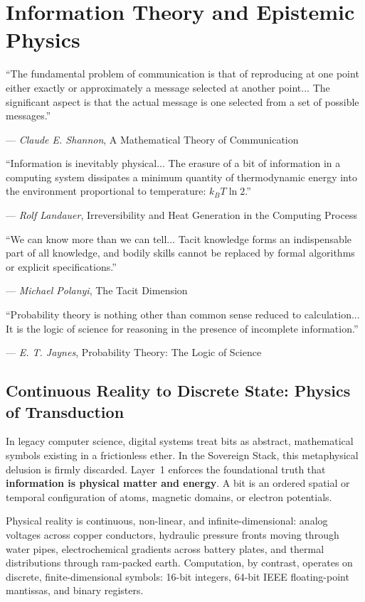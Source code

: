 \chapter{Information Theory and Epistemic Physics}
\label{chap:information_epistemology}

\epigraph{
    ``The fundamental problem of communication is that of reproducing at one point either exactly or approximately a message selected at another point... The significant aspect is that the actual message is one selected from a set of possible messages.''
}{--- \textit{Claude E. Shannon}, \textnormal{A Mathematical Theory of Communication} \cite{shannon1948}}

\epigraph{
    ``Information is inevitably physical... The erasure of a bit of information in a computing system dissipates a minimum quantity of thermodynamic energy into the environment proportional to temperature: $k_B T \ln 2$.''
}{--- \textit{Rolf Landauer}, \textnormal{Irreversibility and Heat Generation in the Computing Process} \cite{landauer1961irreversibility}}

\epigraph{
    ``We can know more than we can tell... Tacit knowledge forms an indispensable part of all knowledge, and bodily skills cannot be replaced by formal algorithms or explicit specifications.''
}{--- \textit{Michael Polanyi}, \textnormal{The Tacit Dimension} \cite{polanyi1966}}

\epigraph{
    ``Probability theory is nothing other than common sense reduced to calculation... It is the logic of science for reasoning in the presence of incomplete information.''
}{--- \textit{E. T. Jaynes}, \textnormal{Probability Theory: The Logic of Science} \cite{jaynes2003}}

\section{Continuous Reality to Discrete State: Physics of Transduction}
\label{sec:physics_of_transduction}

In legacy computer science, digital systems treat bits as abstract, mathematical symbols existing in a frictionless ether. In the Sovereign Stack, this metaphysical delusion is firmly discarded. Layer~1 enforces the foundational truth that \textbf{information is physical matter and energy}. A bit is an ordered spatial or temporal configuration of atoms, magnetic domains, or electron potentials. 

Physical reality is continuous, non-linear, and infinite-dimensional: analog voltages across copper conductors, hydraulic pressure fronts moving through water pipes, electrochemical gradients across battery plates, and thermal distributions through ram-packed earth. Computation, by contrast, operates on discrete, finite-dimensional symbols: 16-bit integers, 64-bit IEEE floating-point mantissas, and binary registers.

